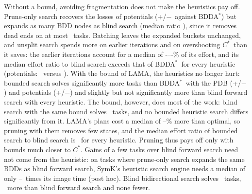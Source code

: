 \documentclass[letterpaper]{article}
\newcommand{\copt}{\ensuremath{C^{*}}}
\newcommand{\bddastar}{BDDA\ensuremath{^{*}}}
\theoremstyle{plain}
\theoremstyle{definition}
\theoremstyle{remark}
\begin{document}
Without a bound, avoiding fragmentation does not make the heuristics pay off.
Prune-only search recovers the losses of potentials (+\RemPotPruneVsPlainGains/$-$\RemPotPruneVsPlainLosses\ against \bddastar) but expands as many BDD nodes as blind search (median ratio \RemPotPruneEffortRemedy), since it removes dead ends on at most \RemPhMaxPruneDeadEnds\ tasks.
Batching leaves the expanded buckets unchanged, and unsplit search spends more on earlier iterations and on overshooting \copt\ than it saves: the earlier iterations account for a median of \the{}-\UbMaxLastShare\relax--\the{}-\UbMinLastShare\relax\% of its effort, and its median effort ratio to blind search exceeds that of \bddastar\ for every heuristic (potentials: \UbPotEffortUnsplit\ versus \UbPotEffortPlain).
With the bound of LAMA, the heuristics no longer hurt: bounded search solves significantly more tasks than \bddastar\ with the PDB (+\BdPdbVsPlainGains/$-$\BdPdbVsPlainLosses) and potentials (+\BdPotVsPlainGains/$-$\BdPotVsPlainLosses) and slightly but not significantly more than blind forward search with every heuristic.
The bound, however, does most of the work: blind search with the same bound solves \BdSolvedBlindBounded\ tasks, and no bounded heuristic search differs significantly from it.
LAMA's plans cost a median of \BdBoundExcessMin--\BdBoundExcessMax\% more than optimal, so pruning with them removes few states, and the median effort ratio of bounded search to blind search is \BdPotEffortBounded\ for every heuristic.
Pruning thus pays off only with bounds much closer to \copt.
Gains of a few tasks over blind forward search need not come from the heuristic: on tasks where prune-only search expands the same BDDs as blind forward search, SymK's heuristic search engine needs a median of only \RemPhPdbPruneImageTime--\RemPhMsPruneImageTime\ times its image time (post hoc).
Blind bidirectional search solves \RemSolvedBlindBd\ tasks, \RemBdVsFwGains\ more than blind forward search and none fewer.
\end{document}
